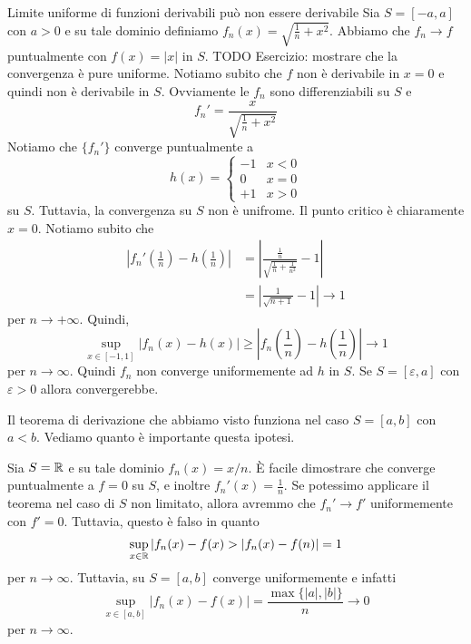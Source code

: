 \documentclass[a4paper]{article}
\begin{document}
\begin{snippetexample}{Limite uniforme di funzioni derivabili può non essere derivabile}
    Sia \(S = [-a, a]\) con \(a > 0\) e su tale dominio definiamo \(f_n(x) = \sqrt{\frac1n + x^2}\).
    Abbiamo che \(f_n \to f\) puntualmente con \(f(x) = |x|\) in \(S\).
    TODO Esercizio: mostrare che la convergenza è pure uniforme.
    Notiamo subito che \(f\) non è derivabile in \(x=0\) e quindi non è derivabile in \(S\).
    Ovviamente le \(f_n\) sono differenziabili su \(S\) e \[
        f_n' = \frac{x}{\sqrt{\frac1n + x^2}}
    \]
    Notiamo che \(\{f_n'\}\) converge puntualmente a \[
        h(x) = \begin{cases}
            -1 & x < 0 \\
            0 & x = 0 \\
            +1 & x > 0
        \end{cases}
    \]
    su \(S\).
    Tuttavia, la convergenza su \(S\) non è unifrome.
    Il punto critico è chiaramente \(x=0\).
    Notiamo subito che
    \begin{align*}
        \left|f_n'\left(\frac1n\right) - h\left(\frac1n\right)\right|
        &= \left|
            \frac{\frac1n}{\sqrt{\frac1n + \frac{1}{n^2}}} - 1
        \right| \\
        &= \left|
            \frac{1}{\sqrt{n+1}} - 1
        \right| \to 1
    \end{align*}
    per \(n \to +\infty\).
    Quindi,
    \[
        \sup_{x \in [-1,1]} |f_n(x) - h(x)| \geq \left|f_n\left(\frac1n\right) - h\left(\frac1n\right)\right| \to 1
    \]
    per \(n \to \infty\).
    Quindi \(f_n\) non converge uniformemente ad \(h\) in \(S\).
    Se \(S = [\varepsilon, a]\) con \(\varepsilon > 0\) allora convergerebbe.
\end{snippetexample}

Il teorema di derivazione che abbiamo visto funziona nel caso
\(S = [a,b]\) con \(a<b\).
Vediamo quanto è importante questa ipotesi.

\begin{snippetexample}{}
    Sia \(S = \mathbb{R}\) e su tale dominio \(f_n(x) = x/n\).
    È facile dimostrare che converge puntualmente a \(f=0\) su \(S\),
    e inoltre
    \(f_n'(x) = \frac1n\).
    Se potessimo applicare il teorema nel caso di \(S\) non limitato,
    allora avremmo che \(f_n' \to f'\) uniformemente con \(f' = 0\).
    Tuttavia, questo è falso in quanto
    \begin{align*}
        \sup_{x\in\mathbb{R}} |f_n(x) - f(x) > |f_n(x) - f(n)| = 1
    \end{align*}
    per \(n \to \infty\).
    Tuttavia, su \(S = [a,b]\) converge uniformemente e infatti
    \[
        \sup_{x\in [a,b]} |f_n(x) - f(x)| = \frac{\max\{|a|,|b|\}}{n} \to 0
    \]
    per \(n \to \infty\).
\end{snippetexample}
\end{document}
